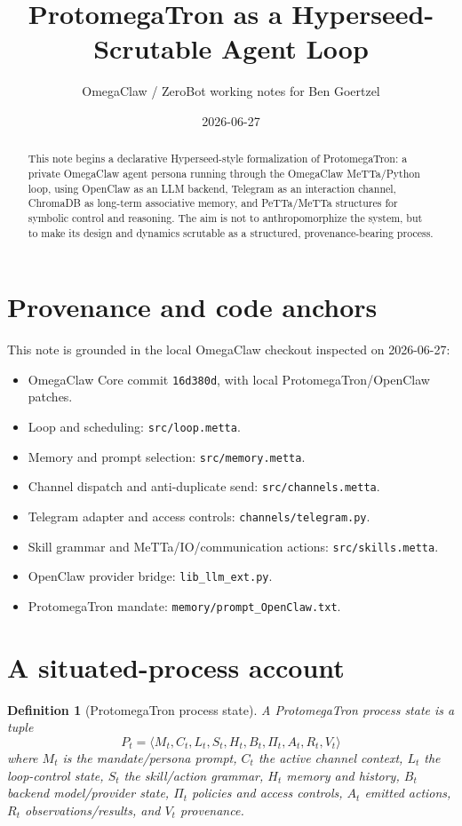 \documentclass[11pt]{article}
\title{ProtomegaTron as a Hyperseed-Scrutable Agent Loop}
\author{OmegaClaw / ZeroBot working notes for Ben Goertzel}
\date{2026-06-27}
\newtheorem{definition}{Definition}
\begin{document}
\maketitle

\begin{abstract}
This note begins a declarative Hyperseed-style formalization of ProtomegaTron:
a private OmegaClaw agent persona running through the OmegaClaw MeTTa/Python loop,
using OpenClaw as an LLM backend, Telegram as an interaction channel, ChromaDB as
long-term associative memory, and PeTTa/MeTTa structures for symbolic control and
reasoning.  The aim is not to anthropomorphize the system, but to make its design
and dynamics scrutable as a structured, provenance-bearing process.
\end{abstract}

\section{Provenance and code anchors}

This note is grounded in the local OmegaClaw checkout inspected on 2026-06-27:
\begin{itemize}
  \item OmegaClaw Core commit \texttt{16d380d}, with local ProtomegaTron/OpenClaw patches.
  \item Loop and scheduling: \texttt{src/loop.metta}.
  \item Memory and prompt selection: \texttt{src/memory.metta}.
  \item Channel dispatch and anti-duplicate send: \texttt{src/channels.metta}.
  \item Telegram adapter and access controls: \texttt{channels/telegram.py}.
  \item Skill grammar and MeTTa/IO/communication actions: \texttt{src/skills.metta}.
  \item OpenClaw provider bridge: \texttt{lib\_llm\_ext.py}.
  \item ProtomegaTron mandate: \texttt{memory/prompt\_OpenClaw.txt}.
\end{itemize}

\section{A situated-process account}

\begin{definition}[ProtomegaTron process state]
A ProtomegaTron process state is a tuple
\[
  P_t = \langle M_t, C_t, L_t, S_t, H_t, B_t, \Pi_t, A_t, R_t, V_t \rangle
\]
where $M_t$ is the mandate/persona prompt, $C_t$ the active channel context,
$L_t$ the loop-control state, $S_t$ the skill/action grammar, $H_t$ memory and
history, $B_t$ backend model/provider state, $\Pi_t$ policies and access controls,
$A_t$ emitted actions, $R_t$ observations/results, and $V_t$ provenance.
\end{definition}
\end{document}
